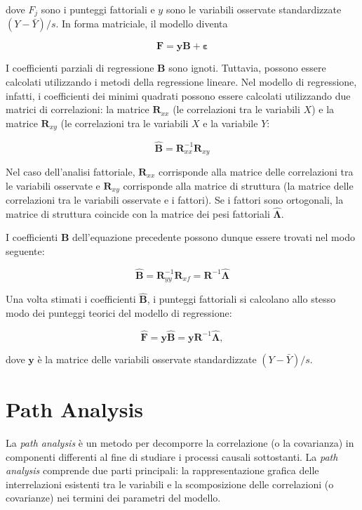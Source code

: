 \documentclass[
  11pt,
]{krantz}
\theoremstyle{definition}
\theoremstyle{definition}
\theoremstyle{definition}
\theoremstyle{definition}
\theoremstyle{remark}
\begin{document}
dove \(F_j\) sono i punteggi fattoriali e \(y\) sono le variabili osservate standardizzate \((Y-\bar{Y})/s\). In forma matriciale, il modello diventa

\[
\textbf{F} = \textbf{y} \textbf{B} +
\boldsymbol{\varepsilon}
\]

I coefficienti parziali di regressione \textbf{B} sono ignoti. Tuttavia, possono essere calcolati utilizzando i metodi della regressione lineare. Nel modello di regressione, infatti, i coefficienti dei minimi quadrati possono essere calcolati utilizzando due matrici di correlazioni: la matrice \(\textbf{R}_{xx}\) (le correlazioni tra le variabili \(X\)) e la matrice \(\textbf{R}_{xy}\) (le correlazioni tra le variabili \(X\) e la variabile \(Y\):

\[
\hat{\textbf{B}} = \textbf{R}_{xx}^{-1}\textbf{R}_{xy}
\]

Nel caso dell'analisi fattoriale, \(\textbf{R}_{xx}\) corrisponde alla matrice delle correlazioni tra le variabili osservate e \(\textbf{R}_{xy}\) corrisponde alla matrice di struttura (la matrice delle correlazioni tra le variabili osservate e i fattori). Se i fattori sono ortogonali, la matrice di struttura coincide con la matrice dei pesi fattoriali \(\hat{\boldsymbol{\Lambda}}\).

I coefficienti \textbf{B} dell'equazione precedente possono dunque essere trovati nel modo seguente:

\begin{equation}
\hat{\textbf{B}} = \textbf{R}_{yy}^{-1}\textbf{R}_{xf}=
\textbf{R}^{-1}\hat{\boldsymbol{\Lambda}}
\end{equation}

Una volta stimati i coefficienti \(\hat{\textbf{B}}\), i punteggi fattoriali si calcolano allo stesso modo dei punteggi teorici del modello di regressione:

\begin{equation}
\hat{\textbf{F}} = \textbf{y} \hat{\textbf{B}} = \textbf{y}
\textbf{R}^{-1}\hat{\boldsymbol{\Lambda}},
\end{equation}

dove \(\textbf{y}\) è la matrice delle variabili osservate standardizzate \((Y-\bar{Y})/s\).

\hypertarget{ch:path_analysis}{%
\chapter{Path Analysis}\label{ch:path_analysis}}

La \emph{path analysis} è un metodo per decomporre la correlazione (o la covarianza) in componenti differenti al fine di studiare i processi causali sottostanti. La \emph{path analysis} comprende due parti principali: la rappresentazione grafica delle interrelazioni esistenti tra le variabili e la scomposizione delle correlazioni (o covarianze) nei termini dei parametri del modello.
\end{document}
